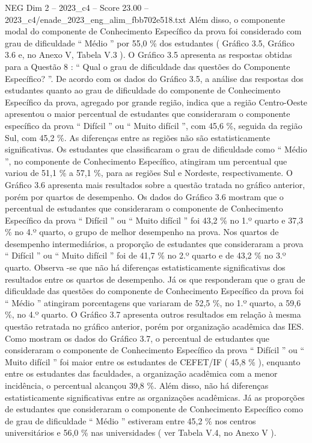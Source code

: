 \begin{textsample}{NEG Dim 2 – 2023\_c4 – Score 23.00 – 2023\_c4/enade\_2023\_eng\_alim\_fbb702e518.txt}
Além disso, o componente modal do componente de Conhecimento Específico da prova foi considerado com grau de dificuldade “ Médio ” por 55,0 \% dos estudantes ( Gráfico 3.5, Gráfico 3.6 e, no Anexo V, Tabela V.3 ).
O Gráfico 3.5 apresenta as respostas obtidas para a Questão 8 : “ Qual o grau de dificuldade das questões do Componente Específico? ”.
De acordo com os dados do Gráfico 3.5, a análise das respostas dos estudantes quanto ao grau de dificuldade do componente de Conhecimento Específico da prova, agregado por grande região, indica que a região Centro-Oeste apresentou o maior percentual de estudantes que consideraram o componente específico da prova “ Difícil ” ou “ Muito difícil ”, com 45,6 \%, seguida da região Sul, com 45,2 \%.
As diferenças entre as regiões não são estatisticamente significativas.
Os estudantes que classificaram o grau de dificuldade como “ Médio ”, no componente de Conhecimento Específico, atingiram um percentual que variou de 51,1 \% a 57,1 \%, para as regiões Sul e Nordeste, respectivamente.
O Gráfico 3.6 apresenta mais resultados sobre a questão tratada no gráfico anterior, porém por quartos de desempenho.
Os dados do Gráfico 3.6 mostram que o percentual de estudantes que consideraram o componente de Conhecimento Específico da prova “ Difícil ” ou “ Muito difícil ” foi 43,2 \% no 1.º quarto e 37,3 \% no 4.º quarto, o grupo de melhor desempenho na prova.
Nos quartos de desempenho intermediários, a proporção de estudantes que consideraram a prova “ Difícil ” ou “ Muito difícil ” foi de 41,7 \% no 2.º quarto e de 43,2 \% no 3.º quarto.
Observa -se que não há diferenças estatisticamente significativas dos resultados entre os quartos de desempenho.
Já os que responderam que o grau de dificuldade das questões do componente de Conhecimento Específico da prova foi “ Médio ” atingiram porcentagens que variaram de 52,5 \%, no 1.º quarto, a 59,6 \%, no 4.º quarto.
O Gráfico 3.7 apresenta outros resultados em relação à mesma questão retratada no gráfico anterior, porém por organização acadêmica das IES.
Como mostram os dados do Gráfico 3.7, o percentual de estudantes que consideraram o componente de Conhecimento Específico da prova “ Difícil ” ou “ Muito difícil ” foi maior entre os estudantes de CEFET/IF ( 45,8 \% ), enquanto entre os estudantes das faculdades, a organização acadêmica com a menor incidência, o percentual alcançou 39,8 \%.
Além disso, não há diferenças estatisticamente significativas entre as organizações acadêmicas.
Já as proporções de estudantes que consideraram o componente de Conhecimento Específico como de grau de dificuldade “ Médio ” estiveram entre 45,2 \% nos centros universitários e 56,0 \% nas universidades ( ver Tabela V.4, no Anexo V ).

\end{textsample}
